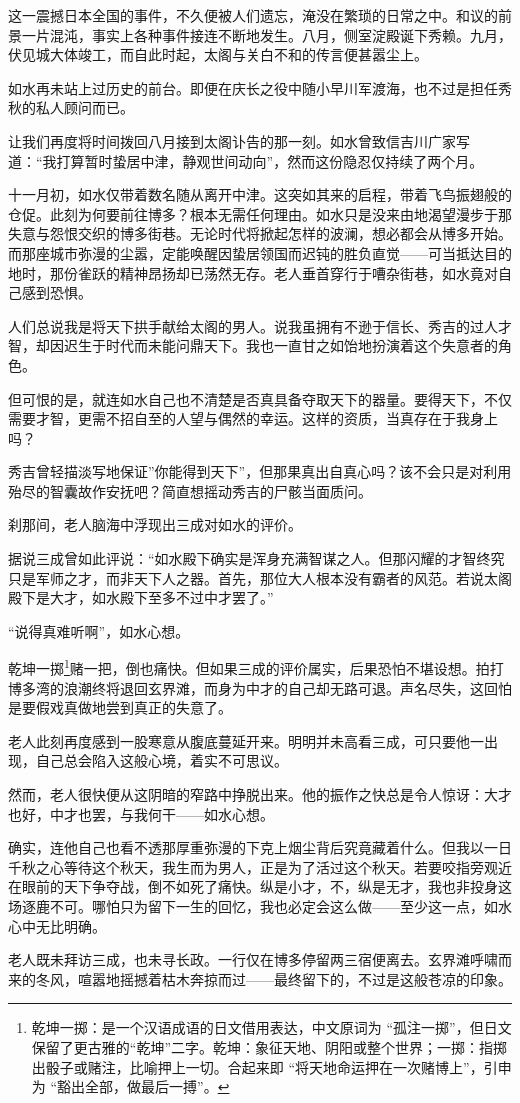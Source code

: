\documentclass[
]{book}
\begin{document}
这一震撼日本全国的事件，不久便被人们遗忘，淹没在繁琐的日常之中。和议的前景一片混沌，事实上各种事件接连不断地发生。八月，侧室淀殿诞下秀赖。九月，伏见城大体竣工，而自此时起，太阁与关白不和的传言便甚嚣尘上。

如水再未站上过历史的前台。即便在庆长之役中随小早川军渡海，也不过是担任秀秋的私人顾问而已。

让我们再度将时间拨回八月接到太阁讣告的那一刻。如水曾致信吉川广家写道：``我打算暂时蛰居中津，静观世间动向''，然而这份隐忍仅持续了两个月。

十一月初，如水仅带着数名随从离开中津。这突如其来的启程，带着飞鸟振翅般的仓促。此刻为何要前往博多？根本无需任何理由。如水只是没来由地渴望漫步于那失意与怨恨交织的博多街巷。无论时代将掀起怎样的波澜，想必都会从博多开始。而那座城市弥漫的尘嚣，定能唤醒因蛰居领国而迟钝的胜负直觉------可当抵达目的地时，那份雀跃的精神昂扬却已荡然无存。老人垂首穿行于嘈杂街巷，如水竟对自己感到恐惧。

人们总说我是将天下拱手献给太阁的男人。说我虽拥有不逊于信长、秀吉的过人才智，却因迟生于时代而未能问鼎天下。我也一直甘之如饴地扮演着这个失意者的角色。

但可恨的是，就连如水自己也不清楚是否真具备夺取天下的器量。要得天下，不仅需要才智，更需不招自至的人望与偶然的幸运。这样的资质，当真存在于我身上吗？

秀吉曾轻描淡写地保证''你能得到天下''，但那果真出自真心吗？该不会只是对利用殆尽的智囊故作安抚吧？简直想摇动秀吉的尸骸当面质问。

刹那间，老人脑海中浮现出三成对如水的评价。

据说三成曾如此评说：``如水殿下确实是浑身充满智谋之人。但那闪耀的才智终究只是军师之才，而非天下人之器。首先，那位大人根本没有霸者的风范。若说太阁殿下是大才，如水殿下至多不过中才罢了。''

``说得真难听啊''，如水心想。

乾坤一掷\footnote{乾坤一掷：是一个汉语成语的日文借用表达，中文原词为 ``孤注一掷''，但日文保留了更古雅的``乾坤''二字。乾坤：象征天地、阴阳或整个世界；一掷：指掷出骰子或赌注，比喻押上一切。合起来即 ``将天地命运押在一次赌博上''，引申为 ``豁出全部，做最后一搏''。}赌一把，倒也痛快。但如果三成的评价属实，后果恐怕不堪设想。拍打博多湾的浪潮终将退回玄界滩，而身为中才的自己却无路可退。声名尽失，这回怕是要假戏真做地尝到真正的失意了。

老人此刻再度感到一股寒意从腹底蔓延开来。明明并未高看三成，可只要他一出现，自己总会陷入这般心境，着实不可思议。

然而，老人很快便从这阴暗的窄路中挣脱出来。他的振作之快总是令人惊讶：大才也好，中才也罢，与我何干------如水心想。

确实，连他自己也看不透那厚重弥漫的下克上烟尘背后究竟藏着什么。但我以一日千秋之心等待这个秋天，我生而为男人，正是为了活过这个秋天。若要咬指旁观近在眼前的天下争夺战，倒不如死了痛快。纵是小才，不，纵是无才，我也非投身这场逐鹿不可。哪怕只为留下一生的回忆，我也必定会这么做------至少这一点，如水心中无比明确。

老人既未拜访三成，也未寻长政。一行仅在博多停留两三宿便离去。玄界滩呼啸而来的冬风，喧嚣地摇撼着枯木奔掠而过------最终留下的，不过是这般苍凉的印象。

\printbibliography
\end{document}
